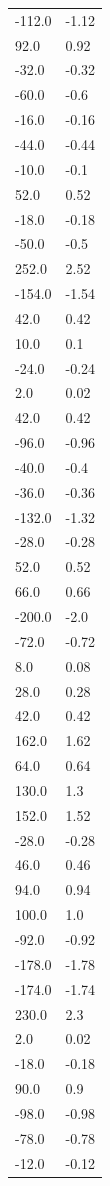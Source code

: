 \begin{longtable}{ll}
-112.0 & -1.12 \\
92.0 & 0.92 \\
-32.0 & -0.32 \\
-60.0 & -0.6 \\
-16.0 & -0.16 \\
-44.0 & -0.44 \\
-10.0 & -0.1 \\
52.0 & 0.52 \\
-18.0 & -0.18 \\
-50.0 & -0.5 \\
252.0 & 2.52 \\
-154.0 & -1.54 \\
42.0 & 0.42 \\
10.0 & 0.1 \\
-24.0 & -0.24 \\
2.0 & 0.02 \\
42.0 & 0.42 \\
-96.0 & -0.96 \\
-40.0 & -0.4 \\
-36.0 & -0.36 \\
-132.0 & -1.32 \\
-28.0 & -0.28 \\
52.0 & 0.52 \\
66.0 & 0.66 \\
-200.0 & -2.0 \\
-72.0 & -0.72 \\
8.0 & 0.08 \\
28.0 & 0.28 \\
42.0 & 0.42 \\
162.0 & 1.62 \\
64.0 & 0.64 \\
130.0 & 1.3 \\
152.0 & 1.52 \\
-28.0 & -0.28 \\
46.0 & 0.46 \\
94.0 & 0.94 \\
100.0 & 1.0 \\
-92.0 & -0.92 \\
-178.0 & -1.78 \\
-174.0 & -1.74 \\
230.0 & 2.3 \\
2.0 & 0.02 \\
-18.0 & -0.18 \\
90.0 & 0.9 \\
-98.0 & -0.98 \\
-78.0 & -0.78 \\
-12.0 & -0.12 \\

\end{longtable}
